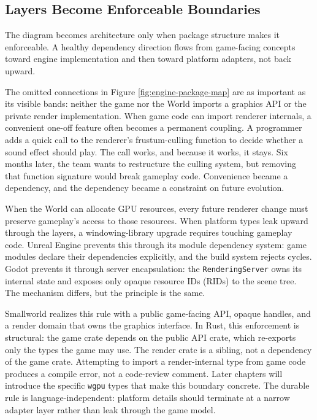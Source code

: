 \documentclass[
  11pt,
  letterpaper,
  DIV=11,
  numbers=noendperiod,
  twoside,
  open=right]{scrreprt}
\begin{document}
\subsection{Layers Become Enforceable
Boundaries}\label{layers-become-enforceable-boundaries}

The diagram becomes architecture only when package structure makes it
enforceable. A healthy dependency direction flows from game-facing
concepts toward engine implementation and then toward platform adapters,
not back upward.

The omitted connections in Figure \ref{fig:engine-package-map} are as
important as its visible bands: neither the game nor the World imports a
graphics API or the private render implementation. When game code can
import renderer internals, a convenient one-off feature often becomes a
permanent coupling. A programmer adds a quick call to the renderer's
frustum-culling function to decide whether a sound effect should play.
The call works, and because it works, it stays. Six months later, the
team wants to restructure the culling system, but removing that function
signature would break gameplay code. Convenience became a dependency,
and the dependency became a constraint on future evolution.

When the World can allocate GPU resources, every future renderer change
must preserve gameplay's access to those resources. When platform types
leak upward through the layers, a windowing-library upgrade requires
touching gameplay code. Unreal Engine prevents this through its module
dependency system: game modules declare their dependencies explicitly,
and the build system rejects cycles. Godot prevents it through server
encapsulation: the \texttt{RenderingServer} owns its internal state and
exposes only opaque resource IDs (RIDs) to the scene tree. The mechanism
differs, but the principle is the same.

Smallworld realizes this rule with a public game-facing API, opaque
handles, and a render domain that owns the graphics interface. In Rust,
this enforcement is structural: the game crate depends on the public API
crate, which re-exports only the types the game may use. The render
crate is a sibling, not a dependency of the game crate. Attempting to
import a render-internal type from game code produces a compile error,
not a code-review comment. Later chapters will introduce the specific
\texttt{wgpu} types that make this boundary concrete. The durable rule
is language-independent: platform details should terminate at a narrow
adapter layer rather than leak through the game model.
\end{document}

